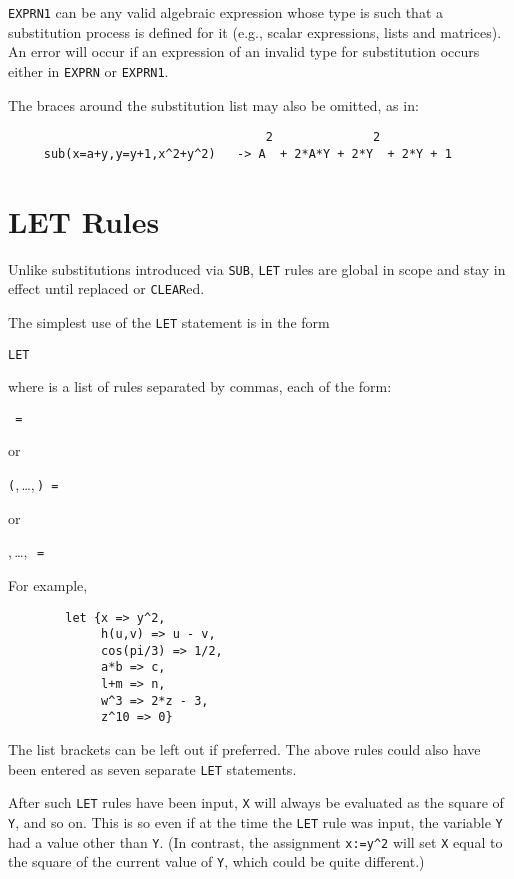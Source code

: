 \texttt{EXPRN1} can be any valid algebraic expression whose type is such that
a substitution process is defined for it (e.g., scalar expressions, lists
and matrices).  An error will occur if an expression of an invalid type
for substitution occurs either in \texttt{EXPRN} or \texttt{EXPRN1}.

The braces around the substitution list may also be omitted, as in:
\begin{verbatim}
                                    2              2
     sub(x=a+y,y=y+1,x^2+y^2)   -> A  + 2*A*Y + 2*Y  + 2*Y + 1
\end{verbatim}

\section{LET Rules}
\hypertarget{command:LET}{}
\hypertarget{reserved:impliesop}{}
Unlike substitutions introduced via \texttt{SUB}, \texttt{LET}
rules are global in scope and stay in effect until replaced or \texttt{CLEAR}ed.

The simplest use of the \texttt{LET} statement is in the form
\begin{syntax}
  \texttt{LET }
\end{syntax}
where  is a list of rules separated by commas, each
of the form:
\begin{syntax}
  \texttt{ = }
\end{syntax}
or
\begin{syntax}
  \texttt{(},\,\dots,\,\texttt{)
    = }
\end{syntax}
or
\begin{syntax}
  ,\,\dots,\,\texttt{
    = }
\end{syntax}
For example,
\begin{verbatim}
        let {x => y^2,
             h(u,v) => u - v,
             cos(pi/3) => 1/2,
             a*b => c,
             l+m => n,
             w^3 => 2*z - 3,
             z^10 => 0}
\end{verbatim}
The list brackets can be left out if preferred.  The above rules could
also have been entered as seven separate \texttt{LET} statements.

After such \texttt{LET} rules have been input, \texttt{X} will always be
evaluated as the square of \texttt{Y}, and so on.  This is so even if at the
time the \texttt{LET} rule was input, the variable \texttt{Y} had a value other
than \texttt{Y}. (In contrast, the assignment \texttt{x:=y\textasciicircum2} 
will set \texttt{X}
equal to the square of the current value of \texttt{Y}, which could be quite
different.)

